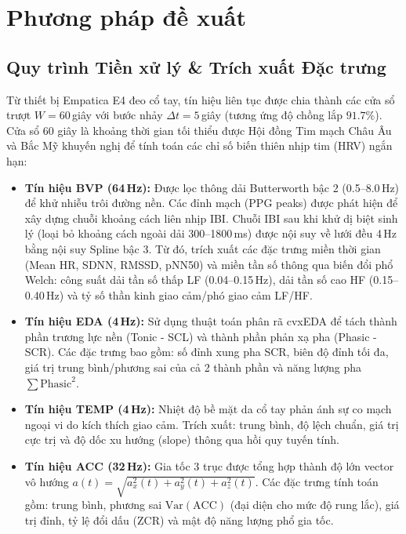 \documentclass[conference]{IEEEtran}
\begin{document}
\section{Phương pháp đề xuất}

\subsection{Quy trình Tiền xử lý \& Trích xuất Đặc trưng}
Từ thiết bị Empatica E4 đeo cổ tay, tín hiệu liên tục được chia thành các cửa sổ trượt $W = 60$\,giây với bước nhảy $\Delta t = 5$\,giây (tương ứng độ chồng lắp $91.7\%$). Cửa sổ 60 giây là khoảng thời gian tối thiểu được Hội đồng Tim mạch Châu Âu và Bắc Mỹ khuyến nghị để tính toán các chỉ số biến thiên nhịp tim (HRV) ngắn hạn:
\begin{itemize}
    \item \textbf{Tín hiệu BVP (64\,Hz):} Được lọc thông dải Butterworth bậc 2 (0.5--8.0\,Hz) để khử nhiễu trôi đường nền. Các đỉnh mạch (PPG peaks) được phát hiện để xây dựng chuỗi khoảng cách liên nhịp IBI. Chuỗi IBI sau khi khử dị biệt sinh lý (loại bỏ khoảng cách ngoài dải 300--1800\,ms) được nội suy về lưới đều 4\,Hz bằng nội suy Spline bậc 3. Từ đó, trích xuất các đặc trưng miền thời gian (Mean HR, SDNN, RMSSD, pNN50) và miền tần số thông qua biến đổi phổ Welch: công suất dải tần số thấp LF (0.04--0.15\,Hz), dải tần số cao HF (0.15--0.40\,Hz) và tỷ số thần kinh giao cảm/phó giao cảm LF/HF.
    \item \textbf{Tín hiệu EDA (4\,Hz):} Sử dụng thuật toán phân rã cvxEDA \cite{greco2016cvxeda} để tách thành phần trương lực nền (Tonic - SCL) và thành phần phản xạ pha (Phasic - SCR). Các đặc trưng bao gồm: số đỉnh xung pha SCR, biên độ đỉnh tối đa, giá trị trung bình/phương sai của cả 2 thành phần và năng lượng pha $\sum \text{Phasic}^2$.
    \item \textbf{Tín hiệu TEMP (4\,Hz):} Nhiệt độ bề mặt da cổ tay phản ánh sự co mạch ngoại vi do kích thích giao cảm. Trích xuất: trung bình, độ lệch chuẩn, giá trị cực trị và độ dốc xu hướng (slope) thông qua hồi quy tuyến tính.
    \item \textbf{Tín hiệu ACC (32\,Hz):} Gia tốc 3 trục được tổng hợp thành độ lớn vector vô hướng $a(t) = \sqrt{a_x^2(t) + a_y^2(t) + a_z^2(t)}$. Các đặc trưng tính toán gồm: trung bình, phương sai $\text{Var}(\text{ACC})$ (đại diện cho mức độ rung lắc), giá trị đỉnh, tỷ lệ đổi dấu (ZCR) và mật độ năng lượng phổ gia tốc.
\end{itemize}
\end{document}
